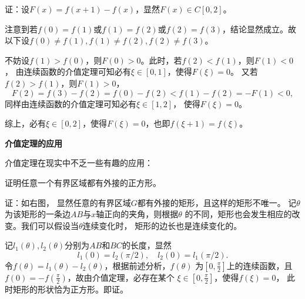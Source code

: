 证：设$F(x)=f(x+1)-f(x)$，显然$F(x)\in C[0,2]$。

注意到若$f(0)=f(1)$或$f(1)=f(2)$或$f(2)=f(3)$，结论显然成立。故以下设$f(0)\ne f(1),
f(1)\ne f(2),f(2)\ne f(3)$。

不妨设$f(1)>f(0)$，则$F(0)>0$。此时，若$f(2)<f(1)$，则$F(1)<0$，
由连续函数的介值定理可知必有$\xi\in[0,1]$，使得$F(\xi)=0$。
又若$f(2)>f(1)$，则$F(1)>0$，
$$F(2)=f(3)-f(2)=f(0)-f(2)<f(1)-f(2)=-F(1)<0,$$
同样由连续函数的介值定理可知必有$\xi\in[1,2]$，
使得$F(\xi)=0$。

综上，必有$\xi\in[0,2]$，使得$F(\xi)=0$，也即$f(\xi+1)=f(\xi)$。\fin

\begin{shaded}
{\bf 介值定理的应用}

介值定理在现实中不乏一些有趣的应用：

\egz 证明任意一个有界区域都有外接的正方形。

证：如右图，
显然任意的有界区域$G$都有外接的矩形，且这样的矩形不唯一。
记$\theta$为该矩形的一条边$AB$与$x$轴正向的夹角，则根据$\theta$
的不同，矩形也会发生相应的改变。我们可以假设{\kaishu 当$\theta$连续变化时，
矩形的边长也是连续变化的}。

记$l_1(\theta),l_2(\theta)$分别为$AB$和$BC$的长度，显然
$$l_1(0)=l_2(\pi/2),\quad l_2(0)=l_1(\pi/2).$$
令$f(\theta)=l_1(\theta)-l_2(\theta)$，根据前述分析，$f(\theta)$
为$\left[0,\frac{\pi}{2}\right]$上的连续函数，且
$f(0)=-f(\frac{\pi}{2})$，故由介值定理，必存在某个
$\xi\in\left[0,\frac{\pi}{2}\right]$，使得$f(\xi)=0$，
此时矩形的形状恰为正方形。即证。\fin


\end{shaded}
